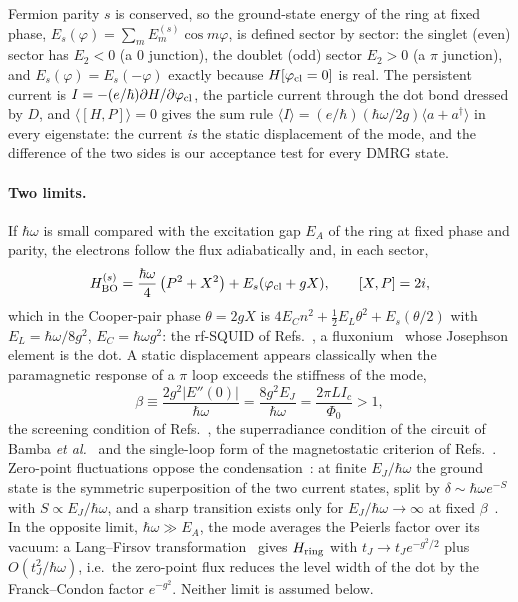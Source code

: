 Fermion parity $s$ is conserved, so the ground-state energy of the ring at fixed phase,
$E_s(\varphi)=\sum_mE^{(s)}_m\cos m\varphi$, is defined sector by sector: the singlet (even) sector has
$E_2<0$ (a $0$ junction), the doublet (odd) sector $E_2>0$ (a $\pi$ junction), and $E_s(\varphi)=E_s(-\varphi)$
exactly because $H[\varphi_{\rm cl}=0]$ is real. The persistent current is
$I=-(e/\hbar)\partial H/\partial\varphi_{\rm cl}$, the particle current through the dot bond dressed by $D$,
and $\langle[H,P]\rangle=0$ gives the sum rule $\langle I\rangle=(e/\hbar)(\hbar\omega/2g)\langle a+a^\dagger\rangle$
in every eigenstate: the current \emph{is} the static displacement of the mode, and the difference of the two
sides is our acceptance test for every DMRG state.

\paragraph*{Two limits.}
If $\hbar\omega$ is small compared with the excitation gap $E_A$ of the ring at fixed phase and parity,
the electrons follow the flux adiabatically and, in each sector,
\begin{equation}
  H^{(s)}_{\rm BO}=\frac{\hbar\omega}{4}\left(P^2+X^2\right)+E_s(\varphi_{\rm cl}+gX),\qquad [X,P]=2i,
  \label{eq:BO}
\end{equation}
which in the Cooper-pair phase $\theta=2gX$ is $4E_Cn^2+\tfrac12E_L\theta^2+E_s(\theta/2)$ with
$E_L=\hbar\omega/8g^2$, $E_C=\hbar\omega g^2$: the rf-SQUID of Refs.~\cite{Friedman2000,Kawabata2006}, a
fluxonium~\cite{Manucharyan2009} whose Josephson element is the dot. A static displacement appears
classically when the paramagnetic response of a $\pi$ loop exceeds the stiffness of the mode,
\begin{equation}
  \beta\equiv\frac{2g^2|E''(0)|}{\hbar\omega}=\frac{8g^2E_J}{\hbar\omega}=\frac{2\pi LI_c}{\Phi_0}>1,
  \label{eq:beta}
\end{equation}
the screening condition of Refs.~\cite{BKS1977,Tsuei2000}, the superradiance condition of the circuit of
Bamba \emph{et al.}~\cite{Bamba2016} and the single-loop form of the magnetostatic criterion of
Refs.~\cite{Andolina2020,RomanRoche2021,Mercurio2024}. Zero-point fluctuations oppose the
condensation~\cite{BambaImoto2017}: at finite $E_J/\hbar\omega$ the ground state is the symmetric
superposition of the two current states, split by $\delta\sim\hbar\omega e^{-S}$ with $S\propto E_J/\hbar\omega$,
and a sharp transition exists only for $E_J/\hbar\omega\to\infty$ at fixed $\beta$~\cite{Hwang2015}. In the
opposite limit, $\hbar\omega\gg E_A$, the mode averages the Peierls factor over its vacuum: a Lang--Firsov
transformation~\cite{LangFirsov1963} gives $H_{\rm ring}$ with $t_J\to t_Je^{-g^2/2}$ plus $O(t_J^2/\hbar\omega)$,
i.e.\ the zero-point flux reduces the level width of the dot by the Franck--Condon factor $e^{-g^2}$.
Neither limit is assumed below.

